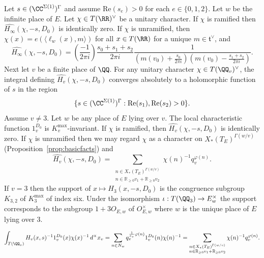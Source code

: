 \begin{proposition}\label{prop:heightFourierTransform} Let $s \in (\CC^{\Sigma(1)})^{\Gamma}$ and assume $\mathrm{Re}(s_e)>0$ for each $e \in\{0,1,2\}$. Let $w$ be the infinite place of $E$. Let $\chi\in T(\RR)^\vee$ be a unitary character. If $\chi$ is ramified then $\widehat{H_\infty}(\chi,-s,D_0)$ is identically zero. If $\chi$ is unramified, then $\chi(x)= e(\langle \ell_w(x) ,m\rangle)$ for all $x \in T(\RR)$ for a unique $m \in \mathfrak t^\vee$, and \begin{equation}\label{eqn:infiniteHeightFourierTransform} \widehat{H_\infty}(\chi,-s,D_0) = \left(\frac{-1}{2\pi i}\right) \frac{s_0+s_1+s_2}{2\pi i} \frac{1}{(m(v_0)+\frac{s_0}{2\pi i})(m(v_0)-\frac{s_1+s_2}{2\pi i})}. \end{equation} Next let $v$ be a finite place of $\QQ$. For any unitary character $\chi\in T(\QQ_v)^\vee$, the integral defining $\widehat{H_v}(\chi,-s,D_0)$ converges absolutely to a holomorphic function of $s$ in the region $$\{s \in (\CC^{\Sigma(1)})^\Gamma : \mathrm{Re}(s_1),\mathrm{Re}(s_2)>0 \}.$$ Assume $v \neq 3$. Let $w$ be any place of $E$ lying over $v$. The local characteristic function $1_v^{D_0}$ is $K_v^{\mathrm{max}}$-invariant. If $\chi$ is ramified, then $\widehat{H_v}(\chi,-s,D_0)$ is identically zero. If $\chi$ is unramified then we may regard $\chi$ as a character on $X_\ast(T_{E})^{\Gamma(w/v)}$ (Proposition~\ref{prop:basicfacts}) and \begin{equation}\label{eqn:finiteHeightFourierTransform} \widehat{H_v}(\chi,-s,D_0) = \sum_{\substack{n \in X_\ast(T_{E})^{\Gamma(w/v)}\\ n \in \mathbb R_{\geq 0}v_1+\mathbb R_{\geq 0}v_2} } \chi(n)^{-1} q_v^{\varphi(n)} . \end{equation} If $v = 3$ then the support of $x \mapsto H_3(x,-s,D_0)$ is the congruence subgroup $K_{3,2}$ of $K_3^{\mathrm{max}}$ of index six. Under the isomorphism $\iota:T(\QQ_3)\to E_w^\times$ the support corresponds to the subgroup $1+3O_{E,w}$ of $O_{E,w}^\times$ where $w$ is the unique place of $E$ lying over $3$. \end{proposition}

\begin{equation}\label{eqn:localfourierassumovern} \int_{T(\QQ_v)} H_v(x,s)^{-1}1_v^{D_0}(x)\chi(x)^{-1}\,d^\times x_v =\sum_{n \in N_w} q_v^{\frac{1}{e_v}\varphi(n)} 1_v^{D_0}(n) \chi(n)^{-1} = \sum_{\substack{n \in X_\ast(T_{E})^{\Gamma(w/v)}\\ n \in \mathbb R_{\geq 0}v_1+\mathbb R_{\geq 0}v_2} } \chi(n)^{-1} q_v^{\varphi(n)} . \end{equation}


